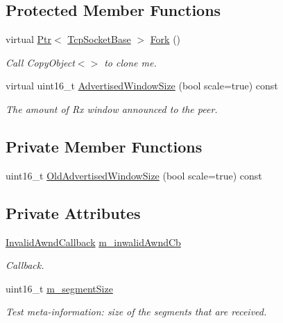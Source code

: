 \subsection*{Protected Member Functions}
\begin{DoxyCompactItemize}
\item 
virtual \hyperlink{classns3_1_1Ptr}{Ptr}$<$ \hyperlink{classns3_1_1TcpSocketBase}{Tcp\+Socket\+Base} $>$ \hyperlink{classTcpSocketAdvertisedWindowProxy_ac0ae0da07f307d681332f75563ab45f4}{Fork} ()
\begin{DoxyCompactList}\small\item\em Call Copy\+Object$<$$>$ to clone me. \end{DoxyCompactList}\item 
virtual uint16\+\_\+t \hyperlink{classTcpSocketAdvertisedWindowProxy_a79348b8b48a47b87d0dcaa59b3d8ee1d}{Advertised\+Window\+Size} (bool scale=true) const 
\begin{DoxyCompactList}\small\item\em The amount of Rx window announced to the peer. \end{DoxyCompactList}\end{DoxyCompactItemize}
\subsection*{Private Member Functions}
\begin{DoxyCompactItemize}
\item 
uint16\+\_\+t \hyperlink{classTcpSocketAdvertisedWindowProxy_a63237b219ba5191f5f446680af53bdda}{Old\+Advertised\+Window\+Size} (bool scale=true) const 
\end{DoxyCompactItemize}
\subsection*{Private Attributes}
\begin{DoxyCompactItemize}
\item 
\hyperlink{classTcpSocketAdvertisedWindowProxy_aac665ab91330f420bf157fc0a28d3c87}{Invalid\+Awnd\+Callback} \hyperlink{classTcpSocketAdvertisedWindowProxy_abdfa0f5233b9dd93113a4ab6b192ddda}{m\+\_\+inwalid\+Awnd\+Cb}
\begin{DoxyCompactList}\small\item\em Callback. \end{DoxyCompactList}\item 
uint16\+\_\+t \hyperlink{classTcpSocketAdvertisedWindowProxy_a944bf6bd76de2dade1bfe634f06afa51}{m\+\_\+segment\+Size}
\begin{DoxyCompactList}\small\item\em Test meta-\/information\+: size of the segments that are received. \end{DoxyCompactList}\end{DoxyCompactItemize}
